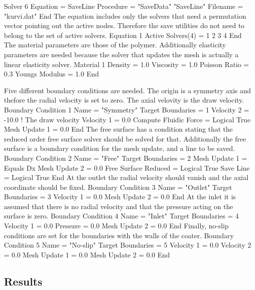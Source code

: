 Solver 6
  Equation = SaveLine
  Procedure = "SaveData" "SaveLine"
  Filename = "kurvi.dat"
End
\ttend
%
The equation includes only the solvers that need a permutation vector 
pointing out the active nodes. Therefore the save utilities do not need to belong
to the set of active solvers.
\ttbegin
Equation 1
  Active Solvers(4) = 1 2 3 4
End
\ttend
%
The material parameters are those of the polymer. Additionally elasticity 
parameters are needed because the solver that updates the mesh is actually
a linear elasticity solver.
\ttbegin
Material 1
  Density = 1.0
  Viscosity = 1.0
  Poisson Ratio = 0.3
  Youngs Modulus = 1.0
End
\ttend

Five different boundary conditions are needed.
The origin is a symmetry axis and thefore the radial velocity is 
set to zero. The axial velovity is the draw velocity.
\ttbegin
Boundary Condition 1
  Name = "Symmetry"
  Target Boundaries = 1
  Velocity 2 = -10.0     ! The draw velocity
  Velocity 1 = 0.0
  Compute Fluidic Force = Logical True
  Mesh Update 1 = 0.0
End
\ttend
%
The free surface has a condition stating that the reduced order free 
surface solver should be solved for that. Additionally the 
free surface is a boundary condition for the mesh update,
and a line to be saved.
\ttbegin
Boundary Condition 2
  Name = "Free"
  Target Boundaries = 2
  Mesh Update 1 = Equals Dx
  Mesh Update 2 = 0.0
  Free Surface Reduced = Logical True
  Save Line = Logical True
End
\ttend
%
At the outlet the radial velocity should vanish and the axial coordinate should
be fixed.
\ttbegin
Boundary Condition 3
  Name = "Outlet"
  Target Boundaries = 3
  Velocity 1 = 0.0
  Mesh Update 2 = 0.0
End
\ttend
%
At the inlet it is assumed that there is no radial velocity and that 
the pressure acting on the surface is zero.
\ttbegin
Boundary Condition 4
  Name = "Inlet"
  Target Boundaries = 4
  Velocity 1 = 0.0
  Pressure = 0.0
  Mesh Update 2 = 0.0
End
\ttend
%
Finally, no-slip conditions are set for the boundaries with the walls of the
coater.
\ttbegin
Boundary Condition 5
  Name = "No-slip"
  Target Boundaries = 5
  Velocity 1 = 0.0
  Velocity 2 = 0.0
  Mesh Update 1 = 0.0
  Mesh Update 2 = 0.0
End
\ttend


\subsection*{Results}

